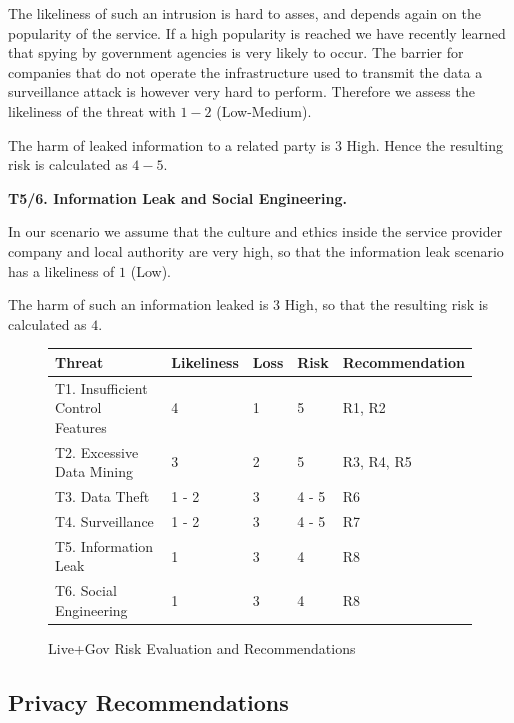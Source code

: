 \documentclass[runningheads,a4paper]{llncs}
\begin{document}
The likeliness of such an intrusion is hard to asses, and depends
again on the popularity of the service. If a high popularity is
reached we have recently learned that spying by government agencies is
very likely to occur. The barrier for companies that do not operate
the infrastructure used to transmit the data a surveillance attack is
however very hard to perform. Therefore we assess the likeliness of
the threat with $1-2$ (Low-Medium).

The harm of leaked information to a related party is $3$ High.
Hence the resulting risk is calculated as $4-5$.

\textbf{T5/6. Information Leak and Social Engineering.}

In our scenario we assume that the culture and ethics inside the
service provider company and local authority are very high, so that
the information leak scenario has a likeliness of $1$ (Low).

The harm of such an information leaked is $3$ High, so that the
resulting risk is calculated as $4$.


\begin{figure}
\centering
\begin{tabular}{|l|l|l|l|l|}
\hline
\textbf{Threat}                   & \textbf{Likeliness} & \textbf{Loss} & \textbf{Risk} & \textbf{Recommendation}
\\\hline
T1. Insufficient Control Features & 4                   & 1             & 5             & R1, R2
\\\hline
T2. Excessive Data Mining         & 3                   & 2             & 5             & R3, R4, R5
\\\hline
T3. Data Theft                    & 1 - 2               & 3             & 4 - 5         & R6
\\\hline
T4. Surveillance                  & 1 - 2               & 3             & 4 - 5         & R7
\\\hline
T5. Information Leak              & 1                   & 3             & 4             & R8
\\\hline
T6. Social Engineering            & 1                   & 3             & 4             & R8
\\\hline
\end{tabular}
\caption{Live+Gov Risk Evaluation and Recommendations}
\label{fig:risks}
\end{figure}


\subsection{Privacy Recommendations}
\label{subsec:priv-rec}
\end{document}

